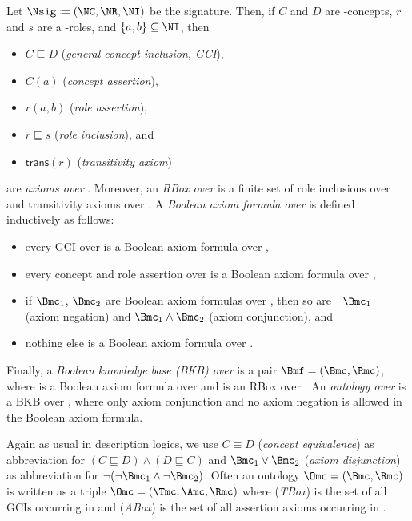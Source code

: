 \begin{definition}
  Let $\Nsig\coloneqq(\NC,\NR,\NI)$ be the signature. Then, if $C$ and $D$ are \Nsig-concepts, $r$
  and $s$ are a \Nsig-roles, and $\{a,b\}\subseteq\NI$, then
  \begin{itemize}
  \item $C \sqsubseteq D$ (\emph{general concept inclusion, GCI}),
  \item $C(a)$ (\emph{concept assertion}),
  \item $r(a,b)$ (\emph{role assertion}),
  \item $r \sqsubseteq s$ (\emph{role inclusion}), and
  \item $\mathsf{trans}(r)$ (\emph{transitivity axiom})
  \end{itemize}
  are \emph{axioms over \Nsig}.
  Moreover, an \emph{RBox \Rmc over \Nsig} is a finite set of role inclusions over \Nsig and
  transitivity axioms over \Nsig. A \emph{Boolean axiom formula over \Nsig} is defined inductively
  as follows:
  \begin{itemize}
  \item every GCI over \Nsig is a Boolean axiom formula over \Nsig,
  \item every concept and role assertion over \Nsig is a Boolean axiom formula over \Nsig,
  \item if $\Bmc_{1}$, $\Bmc_{2}$ are Boolean axiom formulas over \Nsig, then so are $\lnot\Bmc_{1}$
    (axiom negation) and $\Bmc_{1}\land\Bmc_{2}$ (axiom conjunction), and
  \item nothing else is a Boolean axiom formula over \Nsig.
  \end{itemize}

  Finally, a \emph{Boolean knowledge base (BKB) over \Nsig} is a pair $\Bmf = (\Bmc, \Rmc)$, where
  \Bmc is a Boolean axiom formula over \Nsig and \Rmc is an RBox over \Nsig. An \emph{ontology over
    \Nsig} is a BKB over \Nsig, where only axiom conjunction and no axiom negation is allowed in the
  Boolean axiom formula.
\end{definition}

Again as usual in description logics, we use $C \equiv D$ (\emph{concept equivalence}) as abbreviation
for $(C \sqsubseteq D) \land (D \sqsubseteq C)$ and $\Bmc_1\lor\Bmc_2$ (\emph{axiom disjunction}) as
abbreviation for $\lnot(\lnot\Bmc_1\land\lnot\Bmc_2)$.
%
Often an ontology $\Omc = (\Bmc, \Rmc)$ is written as a triple $\Omc = (\Tmc, \Amc, \Rmc)$ where
\Tmc (\emph{TBox}) is the set of all GCIs occurring in \Bmc and \Amc (\emph{ABox}) is the set of all
assertion axioms occurring in \Bmc.


